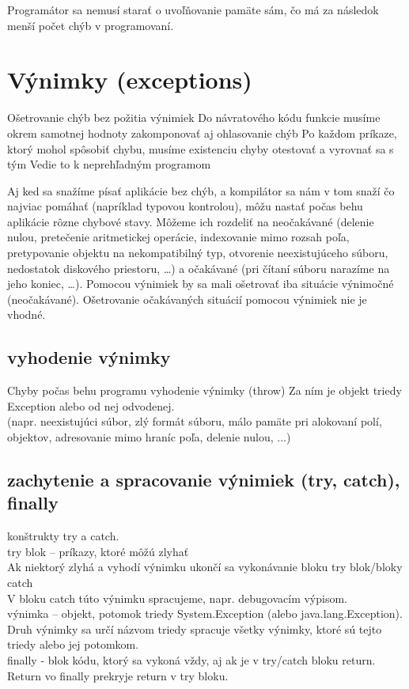 Programátor sa nemusí starať o uvoľňovanie pamäte sám, čo má za následok menší počet chýb v programovaní.





\section{Výnimky (exceptions)}

	Ošetrovanie chýb bez požitia výnimiek
	Do návratového kódu funkcie musíme okrem samotnej hodnoty zakomponovať aj ohlasovanie chýb
	Po každom príkaze, ktorý mohol spôsobiť chybu, musíme existenciu chyby otestovať a vyrovnať sa s tým
	Vedie to k neprehľadným programom

Aj ked sa snažíme písať aplikácie bez chýb, a kompilátor sa nám v tom snaží čo najviac pomáhať (napríklad typovou kontrolou), môžu nastať počas behu aplikácie rôzne chybové stavy. Môžeme ich rozdeliť na neočakávané (delenie nulou, pretečenie aritmetickej operácie, indexovanie mimo rozsah poľa, pretypovanie objektu na nekompatibilný typ, otvorenie neexistujúceho súboru, nedostatok diskového priestoru, …) a očakávané (pri čítaní súboru narazíme na jeho koniec, …). Pomocou výnimiek by sa mali ošetrovať iba situácie výnimočné (neočakávané). Ošetrovanie očakávaných situácií pomocou výnimiek nie je vhodné.



	\subsection{vyhodenie výnimky}

Chyby počas behu programu \ra vyhodenie výnimky (throw) \ra Za ním je objekt triedy Exception alebo od nej odvodenej.\\
\tab (napr. neexistujúci súbor, zlý formát súboru, málo pamäte pri alokovaní polí, objektov, adresovanie mimo hraníc poľa, delenie nulou, ...)


	\subsection{zachytenie a spracovanie výnimiek (try, catch), finally}

	konštrukty try a catch.\\
	try blok -- príkazy, ktoré môžú zlyhať\\
	Ak niektorý zlyhá a vyhodí výnimku \ra ukončí sa vykonávanie bloku try \ra blok/bloky catch\\
	V bloku catch túto výnimku spracujeme, napr. debugovacím výpisom.\\
	výnimka -- objekt, potomok triedy System.Exception (alebo java.lang.Exception). \\
	Druh výnimky sa určí názvom triedy \ra spracuje všetky výnimky, ktoré sú tejto triedy alebo jej potomkom.\\
	finally - blok kódu, ktorý sa vykoná vždy, aj ak je v try/catch bloku return. Return vo finally prekryje return v try bloku. \\

